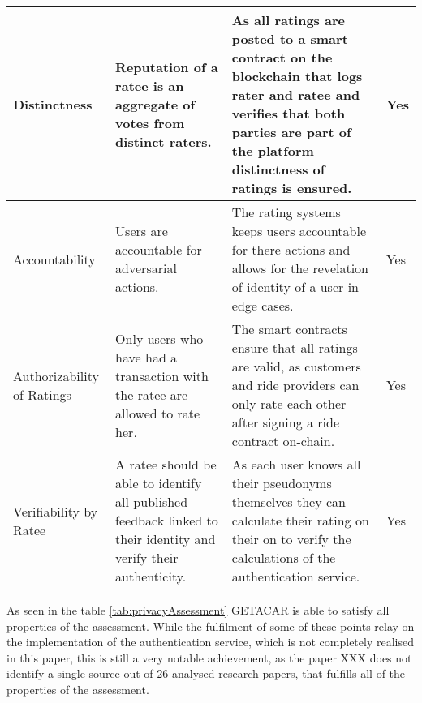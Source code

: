 \begin{longtable}{|p{3cm}|p{4.5cm}|p{5cm}|p{1.5cm}|}
\hline
Distinctness & Reputation of a ratee is an aggregate of votes from distinct raters. & As all ratings are posted to a smart contract on the blockchain that logs rater and ratee and verifies that both parties are part of the platform distinctness of ratings is ensured. & Yes\\
\hline
Accountability & Users are accountable for adversarial actions. & The rating systems keeps users accountable for there actions and allows for the revelation of identity of a user in edge cases.& Yes\\
\hline
Authorizability of Ratings & Only users who have had a transaction with the ratee are allowed to rate her. & The smart contracts ensure that all ratings are valid, as customers and ride providers can only rate each other after signing a ride contract on-chain.& Yes\\
\hline
Verifiability by Ratee & A ratee should be able to identify all published feedback linked to their identity and verify their authenticity. &As each user knows all their pseudonyms themselves they can calculate their rating on their on to verify the calculations of the authentication service.  & Yes\\
\hline
\end{longtable}

As seen in the table \ref{tab:privacyAssessment} GETACAR is able to satisfy all properties of the assessment. While the fulfilment of some of these points relay on the implementation of the authentication service, which is not completely realised in this paper, this is still a very notable achievement, as the paper XXX does not identify a single source out of 26 analysed research papers, that fulfills all of the properties of the assessment.  